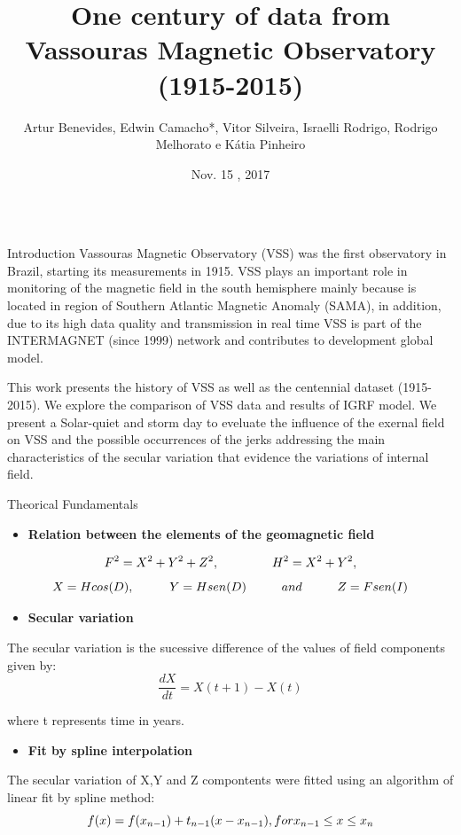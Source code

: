 \documentclass[final,t]{beamer}
\title{\huge One century of data from Vassouras Magnetic Observatory (1915-2015)}
\author[Benevides et. al.]{Artur Benevides, Edwin Camacho*, Vitor Silveira, Israelli Rodrigo, Rodrigo Melhorato e Kátia Pinheiro}
\institute[ON-MCTIC]{Observatório Nacional}
\date[Nov , 2017]{Nov. 15 , 2017}
\begin{document}
  \begin{columns}[t]
    \begin{column}{.47\linewidth}
\begin{block}{Introduction}
\justifying	
 Vassouras Magnetic Observatory (VSS) was the first observatory in Brazil, starting its measurements in 1915. VSS plays an important role in monitoring of the magnetic field in the south hemisphere mainly because is located in region of Southern Atlantic Magnetic Anomaly (SAMA), in addition, due to its high data quality and transmission in real time VSS is part of the INTERMAGNET (since 1999) network and contributes to development global model.
 
 This work presents the history of VSS as well as the centennial dataset (1915-2015). We	explore the comparison of VSS data and results of IGRF model. We present a Solar-quiet and storm day to eveluate the influence of the exernal field on VSS and the possible occurrences of the jerks addressing the main characteristics of the secular variation that evidence the variations of internal field.	

\end{block}		

	
	\begin{block}{Theorical Fundamentals}
		
		
		\begin{itemize}
			\item \textbf{Relation between the elements of the geomagnetic field}
		\end{itemize}	
		\[ F^{2} = X^{2} + Y^{2} + Z^{2}, \hspace{1.5cm} H^{2} = X^{2} + Y^{2}, \]
		\[	   X = Hcos(D), \hspace{1.0cm} Y = Hsen(D) \hspace{1.0cm} and \hspace{1.0cm} Z = Fsen(I)\]
	
		
		
		\begin{itemize}	
			\item \textbf{Secular variation}
		\end{itemize}
		The secular variation is the sucessive difference of the values of field components given by:
		\[\frac{dX}{dt} = X(t+1)-X(t)\]
		
		where t represents time in years.
		
		\begin{itemize}
			\item \textbf{Fit by spline interpolation}
		\end{itemize}
		The secular variation of X,Y and Z compontents were fitted using an algorithm  of linear fit by spline method: 
		\[ f(x)= f(x_{n-1})+t_{n-1}(x-x_{n-1}), \\
		for x_{n-1} \le x \le x_{n} \]\\
		

\end{block}
\end{column}
\end{columns}
\end{document}
